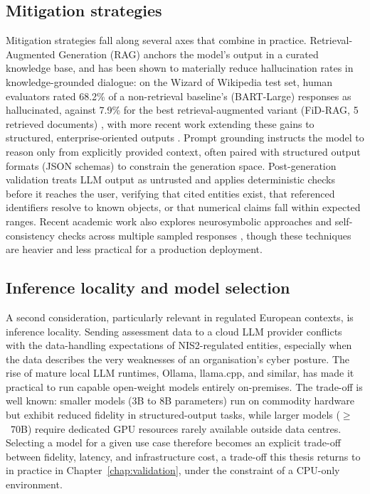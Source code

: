 \subsection{Mitigation strategies}
\label{sec:soa-mitigation-strategies}

Mitigation strategies fall along several axes that combine in practice. Retrieval-Augmented Generation (RAG) anchors the model's output in a curated knowledge base, and has been shown to materially reduce hallucination rates in knowledge-grounded dialogue: on the Wizard of Wikipedia test set, human evaluators rated 68.2\% of a non-retrieval baseline's (BART-Large) responses as hallucinated, against 7.9\% for the best retrieval-augmented variant (FiD-RAG, 5 retrieved documents) \cite{shuster2021retrieval}, with more recent work extending these gains to structured, enterprise-oriented outputs \cite{bechard2024reducing}. Prompt grounding instructs the model to reason only from explicitly provided context, often paired with structured output formats (JSON schemas) to constrain the generation space. Post-generation validation treats LLM output as untrusted and applies deterministic checks before it reaches the user, verifying that cited entities exist, that referenced identifiers resolve to known objects, or that numerical claims fall within expected ranges. Recent academic work also explores neurosymbolic approaches and self-consistency checks across multiple sampled responses \cite{wang2023selfconsistency}, though these techniques are heavier and less practical for a production deployment.

\subsection{Inference locality and model selection}
\label{sec:soa-inference-locality}

A second consideration, particularly relevant in regulated European contexts, is inference locality. Sending assessment data to a cloud LLM provider conflicts with the data-handling expectations of NIS2-regulated entities, especially when the data describes the very weaknesses of an organisation's cyber posture. The rise of mature local LLM runtimes, Ollama, llama.cpp, and similar, has made it practical to run capable open-weight models entirely on-premises. The trade-off is well known: smaller models (3B to 8B parameters) run on commodity hardware but exhibit reduced fidelity in structured-output tasks, while larger models ($\geq$~70B) require dedicated GPU resources rarely available outside data centres. Selecting a model for a given use case therefore becomes an explicit trade-off between fidelity, latency, and infrastructure cost, a trade-off this thesis returns to in practice in Chapter~\ref{chap:validation}, under the constraint of a CPU-only environment.

